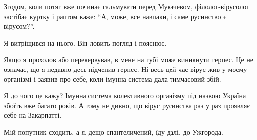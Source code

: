 Згодом, коли потяг вже починає гальмувати перед Мукачевом, філолог-вірусолог
застібає куртку і раптом каже: \enquote{А, може, все навпаки, і саме русинство є
вірусом?}.

Я витріщився на нього. Він ловить погляд і пояснює.

\dshM Якщо я прохолов або перенервував, в мене на губі може виникнути герпес. Це не
означає, що я недавно десь підчепив герпес. Ні \dshM весь цей час вірус жив у моєму
організмі і заявив про себе, коли імунна система дала тимчасовий збій.

Я до чого це кажу? Імунна система колективного організму під назвою Україна
збоїть вже багато років. А тому не дивно, що вірус русинства раз у раз проявляє
себе на Закарпатті.

Мій попутник сходить, а я, дещо спантеличений, їду далі, до Ужгорода.

